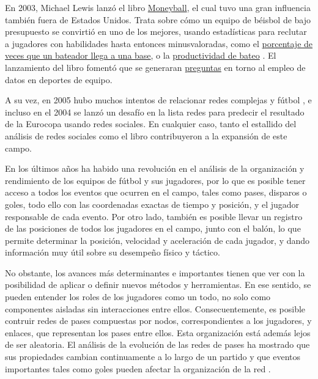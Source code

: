 En 2003, Michael Lewis lanzó el libro \href{https://en.wikipedia.org/wiki/Moneyball}{Moneyball}, el cual tuvo una gran 
influencia también fuera de Estados Unidos. Trata sobre cómo
un equipo de béisbol de bajo presupuesto se convirtió en uno de los mejores, usando estadísticas para reclutar a jugadores 
con habilidades hasta entonces minusvaloradas, como el \href{https://en.wikipedia.org/wiki/On-base_percentage}{porcentaje de veces que un bateador llega a una base}, o 
la \href{https://en.wikipedia.org/wiki/Slugging_percentage}{productividad de bateo} \cite{moneyball-ev}. El lanzamiento del 
libro fomentó que se generaran \href{https://thesportjournal.org/article/an-examination-of-the-moneyball-theory-a-baseball-statistical-analysis/}{preguntas} en torno al empleo de datos en deportes de equipo. 

A su vez, en 2005 hubo muchos intentos de relacionar redes complejas y fútbol \cite{lee2005passes}, 
e incluso en el 2004 se lanzó un desafío en la lista redes \cite{Bundio_Matías_2008} para predecir el resultado de la Eurocopa usando 
redes sociales. En cualquier caso, tanto el estallido del análisis de redes sociales como el libro contribuyeron 
a la expansión de este campo.

En los últimos años ha habido una revolución en el análisis de la organización 
y rendimiento de los equipos de fútbol y sus jugadores, por lo que es posible tener acceso a todos los 
eventos que ocurren en el campo, tales como pases, disparos o goles, todo ello con las coordenadas 
exactas de tiempo y posición, y el jugador responsable de cada evento. Por otro lado, también es 
posible llevar un registro de las posiciones de todos los jugadores en el campo, junto con el balón, 
lo que permite determinar la posición, velocidad y aceleración de cada jugador, y dando información 
muy útil sobre su desempeño físico y táctico. 

No obstante, los avances más determinantes e importantes tienen que ver con la posibilidad de aplicar o 
definir nuevos métodos y herramientas. En ese sentido, se pueden entender los roles de los jugadores 
como un todo, no solo como componentes aisladas sin interacciones entre ellos. Consecuentemente, es 
posible contruir redes de pases compuestas por nodos, correspondientes a los jugadores, y enlaces, 
que representan los pases entre ellos. Esta organización está además lejos de ser 
aleatoria. El análisis de la evolución de las redes de pases ha mostrado que sus propiedades 
cambian continuamente a lo largo de un partido y que eventos importantes tales como goles 
pueden afectar la organización de la red \cite{spatial-and-temporal-entropies}.

